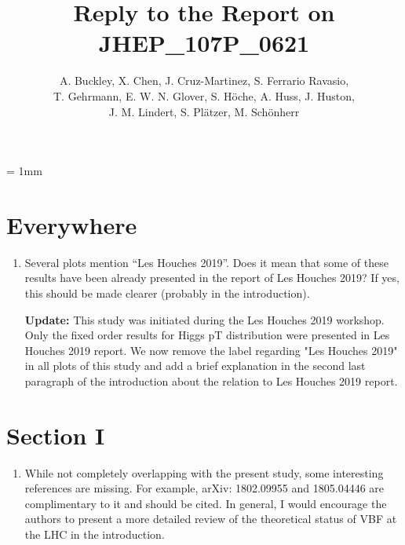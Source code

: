 \documentclass[12pt]{article}
\begin{document}
\unitlength = 1mm
\title{Reply to the Report on JHEP\_107P\_0621}
\author{A. Buckley, X. Chen, J. Cruz-Martinez, S. Ferrario Ravasio,\\ T. Gehrmann, E. W. N. Glover, S. H{\"o}che, A. Huss, J. Huston,\\ J. M. Lindert, S. Pl{\"a}tzer, M. Sch{\"o}nherr}
\date{}
\maketitle

\section*{Everywhere}
\begin{enumerate}
	\item Several plots mention “Les Houches 2019”. Does it mean that some of these results have been already presented in the report of Les Houches 2019? If yes, this should be made clearer (probably in the introduction).

{\bf Update:} This study was initiated during the Les Houches 2019 workshop. Only the fixed order results for Higgs pT distribution were presented in Les Houches 2019 report. We now remove the label regarding "Les Houches 2019" in all plots of this study and add a brief explanation in the second last paragraph of the introduction about the relation to Les Houches 2019 report. 
\end{enumerate}

\section*{Section I}
\begin{enumerate}
\item While not completely overlapping with the present study, some interesting references are missing. For example, arXiv: 1802.09955 and 1805.04446 are complimentary to it and should be cited. In general, I would encourage the authors to present a more detailed review of the theoretical status of VBF at the LHC in the introduction.
\end{enumerate}
\end{document}
